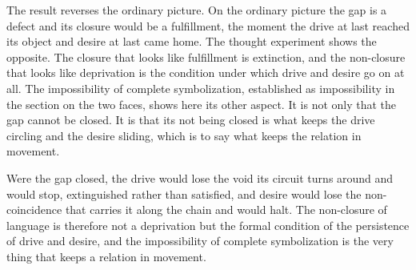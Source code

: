 The result reverses the ordinary picture. On the ordinary picture the gap is a defect and its closure would be a fulfillment, the moment the drive at last reached its object and desire at last came home. The thought experiment shows the opposite. The closure that looks like fulfillment is extinction, and the non-closure that looks like deprivation is the condition under which drive and desire go on at all. The impossibility of complete symbolization, established as impossibility in the section on the two faces, shows here its other aspect. It is not only that the gap cannot be closed. It is that its not being closed is what keeps the drive circling and the desire sliding, which is to say what keeps the relation in movement.

\begin{claim}
Were the gap closed, the drive would lose the void its circuit turns around and would stop, extinguished rather than satisfied, and desire would lose the non-coincidence that carries it along the chain and would halt. The non-closure of language is therefore not a deprivation but the formal condition of the persistence of drive and desire, and the impossibility of complete symbolization is the very thing that keeps a relation in movement.
\end{claim}

